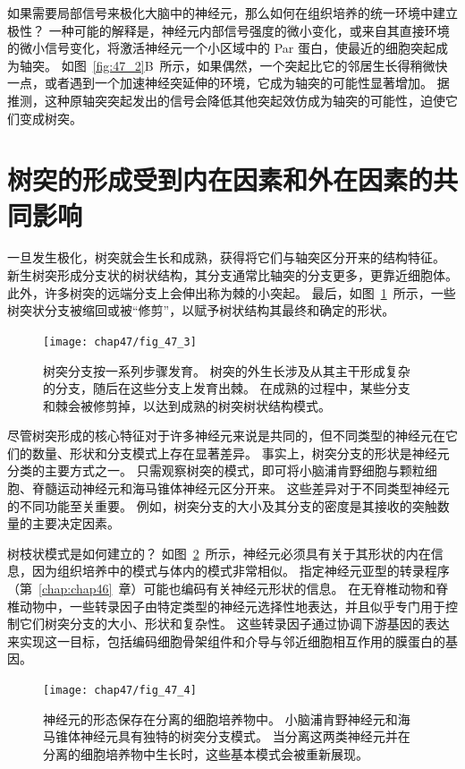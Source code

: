 如果需要局部信号来极化大脑中的神经元，那么如何在组织培养的统一环境中建立极性？
一种可能的解释是，神经元内部信号强度的微小变化，或来自其直接环境的微小信号变化，将激活神经元一个小区域中的 Par 蛋白，使最近的细胞突起成为轴突。
如图~\ref{fig:47_2}B~所示，如果偶然，一个突起比它的邻居生长得稍微快一点，或者遇到一个加速神经突延伸的环境，它成为轴突的可能性显著增加。
据推测，这种原轴突突起发出的信号会降低其他突起效仿成为轴突的可能性，迫使它们变成树突。



\section{树突的形成受到内在因素和外在因素的共同影响}

一旦发生极化，树突就会生长和成熟，获得将它们与轴突区分开来的结构特征。
新生树突形成分支状的树状结构，其分支通常比轴突的分支更多，更靠近细胞体。
此外，许多树突的远端分支上会伸出称为棘的小突起。
最后，如图~\ref{fig:47_3}~所示，一些树突状分支被缩回或被“修剪”，以赋予树状结构其最终和确定的形状。


\begin{figure}[htbp]
	\centering
	\texttt{[image: chap47/fig\_47\_3]}
	\caption{树突分支按一系列步骤发育。
		树突的外生长涉及从其主干形成复杂的分支，随后在这些分支上发育出棘。
		在成熟的过程中，某些分支和棘会被修剪掉，以达到成熟的树突树状结构模式。}
	\label{fig:47_3}
\end{figure}


尽管树突形成的核心特征对于许多神经元来说是共同的，但不同类型的神经元在它们的数量、形状和分支模式上存在显著差异。
事实上，树突分支的形状是神经元分类的主要方式之一。
只需观察树突的模式，即可将小脑浦肯野细胞与颗粒细胞、脊髓运动神经元和海马锥体神经元区分开来。
这些差异对于不同类型神经元的不同功能至关重要。
例如，树突分支的大小及其分支的密度是其接收的突触数量的主要决定因素。


树枝状模式是如何建立的？
如图~\ref{fig:47_4}~所示，神经元必须具有关于其形状的内在信息，因为组织培养中的模式与体内的模式非常相似。
指定神经元亚型的转录程序（第~\ref{chap:chap46}~章）可能也编码有关神经元形状的信息。
在无脊椎动物和脊椎动物中，一些转录因子由特定类型的神经元选择性地表达，并且似乎专门用于控制它们树突分支的大小、形状和复杂性。
这些转录因子通过协调下游基因的表达来实现这一目标，包括编码细胞骨架组件和介导与邻近细胞相互作用的膜蛋白的基因。


\begin{figure}[htbp]
	\centering
	\texttt{[image: chap47/fig\_47\_4]}
	\caption{神经元的形态保存在分离的细胞培养物中。
		小脑浦肯野神经元和海马锥体神经元具有独特的树突分支模式。
		当分离这两类神经元并在分离的细胞培养物中生长时，这些基本模式会被重新展现。}
	\label{fig:47_4}
\end{figure}


